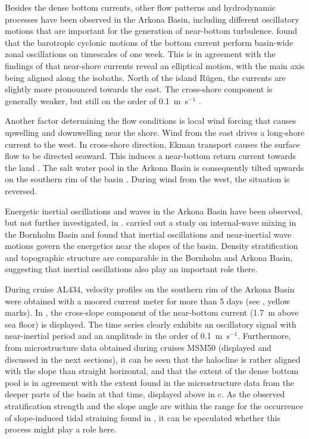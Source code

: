 Besides the dense bottom currents, other flow patterns and hydrodynamic 
processes have been observed in the Arkona Basin, including different 
oscillatory motions that are important for the generation of near-bottom 
turbulence. \cite{lass2003} found that the 
barotropic cyclonic motions of the bottom current perform basin-wide zonal 
oscillations on timescales of one week. This is in agreement with the findings 
of \cite{lass2001} that near-shore currents reveal an elliptical motion, with 
the main axis being aligned along the isobaths. North of the island 
R\"{u}gen, the currents are slightly more pronounced towards the east. The 
cross-shore component is generally weaker, but still on the order of 
0.1~m~s$^{-1}$ \citep[][]{lass1993, lass2001}. 

Another factor determining the flow conditions is local wind forcing 
that causes upwelling and downwelling near the shore. Wind from the east 
drives a long-shore current to the west. In cross-shore direction, Ekman 
transport causes the surface flow to be directed seaward. This induces a 
near-bottom return current towards the land \citep[][]{lass1993}. The salt 
water pool in the Arkona Basin is consequently tilted upwards on the 
southern rim of the basin \citep[][their Fig.\ 11]{lass2003, lass1993}. During 
wind from the west, the situation is reversed.

Energetic inertial oscillations and waves in the Arkona Basin have been 
observed, but not further investigated, in \cite{lass1993}. 
\cite{vanderlee2011} carried out a study on internal-wave mixing in the 
Bornholm Basin and found that inertial oscillations and near-inertial wave 
motions govern the energetics near the slopes of the basin. Density 
stratification and topographic structure are comparable in the Bornholm and 
Arkona Basin, suggesting that inertial oscillations also play an important role 
there.

 During cruise AL434, velocity profiles on the southern rim of the Arkona Basin 
were obtained with a moored current meter for more than 5 days (see 
, yellow marks). In , the cross-slope component of 
the near-bottom current (1.7~m above sea floor) is displayed. The time series 
clearly exhibits an oscillatory signal with near-inertial period and an 
amplitude in the order of 0.1~m~s$^{-1}$. Furthermore, from microstructure data 
obtained during cruises MSM50 (displayed and discussed in the next sections), 
it can be seen that the halocline is rather aligned with the slope than straight 
horizontal, and that the extent of the dense bottom pool is in agreement with 
the extent found in the microstructure data from the deeper parts of the basin 
at that time, displayed above in c. As the observed 
stratification strength and the slope angle are within the range for the 
occurrence of slope-induced tidal straining found in \cite{schulzumlauf2016}, 
it can be speculated whether this process might play a role here.

